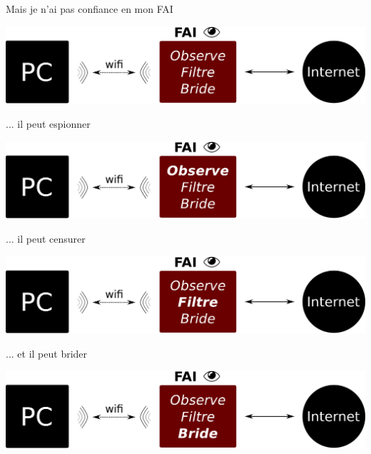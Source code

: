 \documentclass[notes=hide]{beamer}
\begin{document}
\begin{frame}[t]{Mais je n'ai pas confiance en mon FAI}
\begin{center}
\vfill
\includegraphics[width=.75\textwidth]{img/03a-schema-connexionbox.pdf}
\vfill
\end{center}
\end{frame}

\begin{frame}[t]{... il peut espionner}
\begin{center}
\vfill
\includegraphics[width=.75\textwidth]{img/03b-schema-connexionbox.pdf}
\vfill
\end{center}
\end{frame}

\begin{frame}[t]{... il peut censurer}
\begin{center}
\vfill
\includegraphics[width=.75\textwidth]{img/03c-schema-connexionbox.pdf}
\vfill
\end{center}
\end{frame}

\begin{frame}[t]{... et il peut brider}
\begin{center}
\vfill
\includegraphics[width=.75\textwidth]{img/03d-schema-connexionbox.pdf}
\vfill
\end{center}
\end{frame}
\end{document}
